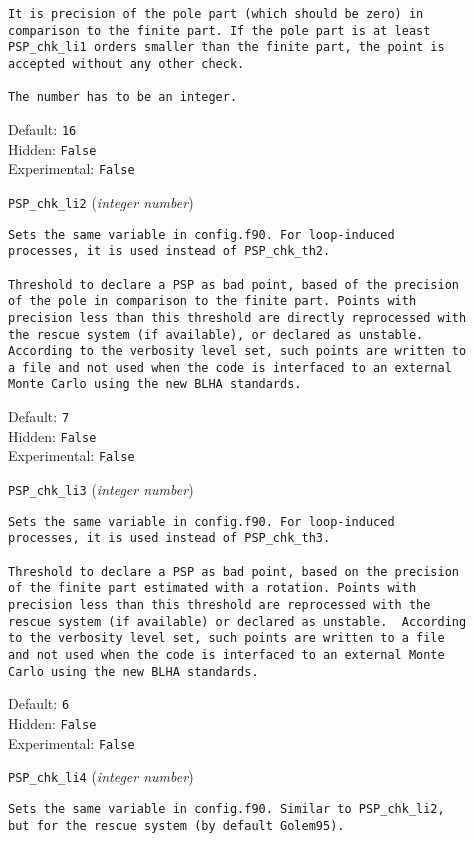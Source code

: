 \begin{basedescript}{\desclabelstyle{\pushlabel}}
\begin{verbatim}
It is precision of the pole part (which should be zero) in
comparison to the finite part. If the pole part is at least
PSP_chk_li1 orders smaller than the finite part, the point is
accepted without any other check.

The number has to be an integer.
\end{verbatim}
Default: \verb|16|
\\Hidden: \verb|False|
\\Experimental: \verb|False|
\\\item[\colorbox{gray!30}{\texttt{PSP\_chk\_li2}}] (\textit{integer number})
\begin{verbatim}
Sets the same variable in config.f90. For loop-induced
processes, it is used instead of PSP_chk_th2.

Threshold to declare a PSP as bad point, based of the precision
of the pole in comparison to the finite part. Points with
precision less than this threshold are directly reprocessed with
the rescue system (if available), or declared as unstable.
According to the verbosity level set, such points are written to
a file and not used when the code is interfaced to an external
Monte Carlo using the new BLHA standards.
\end{verbatim}
Default: \verb|7|
\\Hidden: \verb|False|
\\Experimental: \verb|False|
\\\item[\colorbox{gray!30}{\texttt{PSP\_chk\_li3}}] (\textit{integer number})
\begin{verbatim}
Sets the same variable in config.f90. For loop-induced
processes, it is used instead of PSP_chk_th3.

Threshold to declare a PSP as bad point, based on the precision
of the finite part estimated with a rotation. Points with
precision less than this threshold are reprocessed with the
rescue system (if available) or declared as unstable.  According
to the verbosity level set, such points are written to a file
and not used when the code is interfaced to an external Monte
Carlo using the new BLHA standards.
\end{verbatim}
Default: \verb|6|
\\Hidden: \verb|False|
\\Experimental: \verb|False|
\\\item[\colorbox{gray!30}{\texttt{PSP\_chk\_li4}}] (\textit{integer number})
\begin{verbatim}
Sets the same variable in config.f90. Similar to PSP_chk_li2,
but for the rescue system (by default Golem95).


\end{verbatim}
\end{basedescript}
